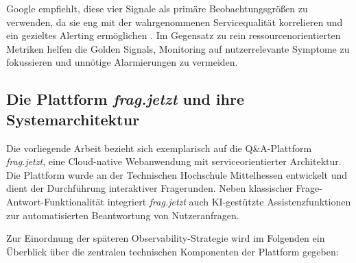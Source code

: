 Google empfiehlt, diese vier Signale als primäre Beobachtungsgrößen zu verwenden, da sie eng mit der wahrgenommenen Servicequalität korrelieren und ein gezieltes Alerting ermöglichen \cite{ewaschukMonitoringDistributedSystems}. Im Gegensatz zu rein ressourcenorientierten Metriken helfen die Golden Signals, Monitoring auf nutzerrelevante Symptome zu fokussieren und unnötige Alarmierungen zu vermeiden.

\subsection{Die Plattform \textit{frag.jetzt} und ihre Systemarchitektur}

Die vorliegende Arbeit bezieht sich exemplarisch auf die Q\&A-Plattform \textit{frag.jetzt}, eine Cloud-native Webanwendung mit serviceorientierter Architektur. Die Plattform wurde an der Technischen Hochschule Mittelhessen entwickelt und dient der Durchführung interaktiver Fragerunden. Neben klassischer Frage-Antwort-Funktionalität integriert \textit{frag.jetzt} auch KI-gestützte Assistenzfunktionen zur automatisierten Beantwortung von Nutzeranfragen.

Zur Einordnung der späteren Observability-Strategie wird im Folgenden ein Überblick über die zentralen technischen Komponenten der Plattform gegeben:

